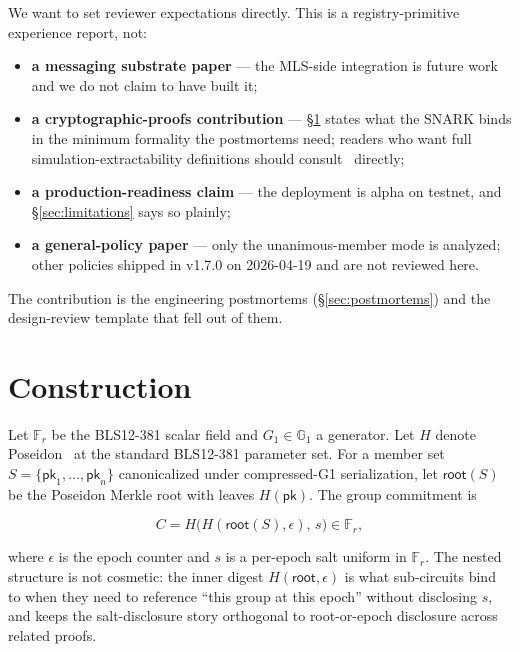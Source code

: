 \documentclass[11pt,a4paper]{article}
\newcommand{\Fr}{\mathbb{F}_r}
\newcommand{\Gone}{\mathbb{G}_1}
\begin{document}
We want to set reviewer expectations directly. This is a registry-primitive experience report, not:

\begin{itemize}
  \item \textbf{a messaging substrate paper} --- the MLS-side integration is future work and we do not claim to have built it;
  \item \textbf{a cryptographic-proofs contribution} --- \S\ref{sec:construction} states what the SNARK binds in the minimum formality the postmortems need; readers who want full simulation-extractability definitions should consult~\cite{baghery2021, lipmaa2019, fuchsbauer2018agm} directly;
  \item \textbf{a production-readiness claim} --- the deployment is alpha on testnet, and \S\ref{sec:limitations} says so plainly;
  \item \textbf{a general-policy paper} --- only the unanimous-member mode is analyzed; other policies shipped in v1.7.0 on 2026-04-19 and are not reviewed here.
\end{itemize}

The contribution is the engineering postmortems (\S\ref{sec:postmortems}) and the design-review template that fell out of them.

\section{Construction}
\label{sec:construction}

Let $\Fr$ be the BLS12-381 scalar field and $G_1 \in \Gone$ a generator. Let $H$ denote Poseidon~\cite{grassi2021} at the standard BLS12-381 parameter set. For a member set $S = \{\mathsf{pk}_1, \ldots, \mathsf{pk}_n\}$ canonicalized under compressed-G1 serialization, let $\mathsf{root}(S)$ be the Poseidon Merkle root with leaves $H(\mathsf{pk})$. The group commitment is

\begin{equation}
C = H\!\bigl(H(\mathsf{root}(S), \epsilon),\, s\bigr) \in \Fr,
\end{equation}

where $\epsilon$ is the epoch counter and $s$ is a per-epoch salt uniform in $\Fr$. The nested structure is not cosmetic: the inner digest $H(\mathsf{root}, \epsilon)$ is what sub-circuits bind to when they need to reference ``this group at this epoch'' without disclosing $s$, and keeps the salt-disclosure story orthogonal to root-or-epoch disclosure across related proofs.
\end{document}
